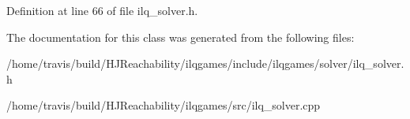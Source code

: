 Definition at line 66 of file ilq\+\_\+solver.\+h.



The documentation for this class was generated from the following files\+:\begin{DoxyCompactItemize}
\item 
/home/travis/build/\+H\+J\+Reachability/ilqgames/include/ilqgames/solver/ilq\+\_\+solver.\+h\item 
/home/travis/build/\+H\+J\+Reachability/ilqgames/src/ilq\+\_\+solver.\+cpp\end{DoxyCompactItemize}
